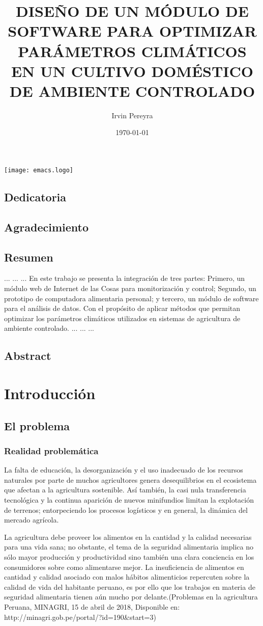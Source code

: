 \documentclass{report}
\title{DISEÑO DE UN MÓDULO DE SOFTWARE PARA OPTIMIZAR PARÁMETROS CLIMÁTICOS EN
  UN CULTIVO DOMÉSTICO DE AMBIENTE CONTROLADO}
\author{Irvin Pereyra}
\date{\today}
\begin{document}
\maketitle
\texttt{[image: emacs.logo]}
\section{Dedicatoria}
\section{Agradecimiento}
\tableofcontents
\newpage
{}
\section{Resumen}
...
...
...
En este trabajo se presenta la integración de tres partes: Primero, un
módulo web de Internet de las Cosas para monitorización y control; Segundo, un
prototipo de computadora alimentaria personal; y tercero, un módulo de software
para el análisis de datos. Con el propósito de aplicar métodos que permitan
optimizar los parámetros climáticos utilizados en sistemas de agricultura de
ambiente controlado.
...
...
...
\section{Abstract}

\chapter{Introducción}
\section{El problema}
\subsection{Realidad problemática}
La falta de educación, la desorganización y el uso inadecuado de los recursos
naturales por parte de muchos agricultores genera desequilibrios en el
ecosistema que afectan a la agricultura sostenible. Así también, la casi nula
transferencia tecnológica y la continua aparición de nuevos minifundios limitan
la explotación de terrenos; entorpeciendo los procesos logísticos y en general,
la dinámica del mercado agrícola.

La agricultura debe proveer los alimentos en la cantidad y la calidad necesarias
para una vida sana; no obstante, el tema de la seguridad alimentaria implica no
sólo mayor producción y productividad sino también una clara conciencia en los
consumidores sobre como alimentarse mejor. La insuficiencia de alimentos en
cantidad y calidad asociado con malos hábitos alimenticios repercuten sobre la
calidad de vida del habitante peruano, es por ello que los trabajos en materia
de seguridad alimentaria tienen aún mucho por delante.(Problemas en la
agricultura Peruana, MINAGRI, 15 de abril de 2018,  Disponible en:
http://minagri.gob.pe/portal/?id=190&start=3)
\end{document}
